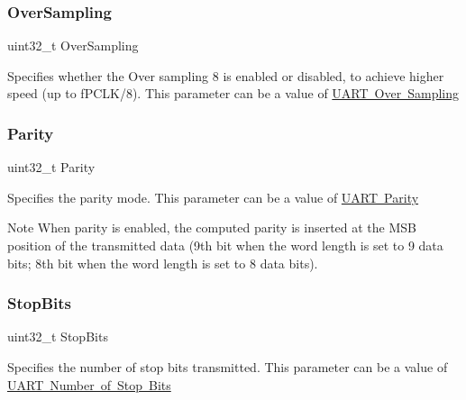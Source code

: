 \subsubsection{\texorpdfstring{Over\+Sampling}{OverSampling}}
{\footnotesize\ttfamily uint32\+\_\+t Over\+Sampling}

Specifies whether the Over sampling 8 is enabled or disabled, to achieve higher speed (up to f\+P\+C\+L\+K/8). This parameter can be a value of \mbox{\hyperlink{group___u_a_r_t___over___sampling}{U\+A\+RT Over Sampling}} \mbox{\label{struct_u_a_r_t___init_type_def_a1d60a99b8f3965f01ab23444b154ba79}} 
\subsubsection{\texorpdfstring{Parity}{Parity}}
{\footnotesize\ttfamily uint32\+\_\+t Parity}

Specifies the parity mode. This parameter can be a value of \mbox{\hyperlink{group___u_a_r_t___parity}{U\+A\+RT Parity}} \begin{DoxyNote}{Note}
When parity is enabled, the computed parity is inserted at the M\+SB position of the transmitted data (9th bit when the word length is set to 9 data bits; 8th bit when the word length is set to 8 data bits). 
\end{DoxyNote}
\mbox{\label{struct_u_a_r_t___init_type_def_a8394ba239444e3e5fe1ada1c37cb1019}} 
\subsubsection{\texorpdfstring{Stop\+Bits}{StopBits}}
{\footnotesize\ttfamily uint32\+\_\+t Stop\+Bits}

Specifies the number of stop bits transmitted. This parameter can be a value of \mbox{\hyperlink{group___u_a_r_t___stop___bits}{U\+A\+RT Number of Stop Bits}} \mbox{\label{struct_u_a_r_t___init_type_def_ae5e60b9a021fe0009588fc86c7584a5a}} 
